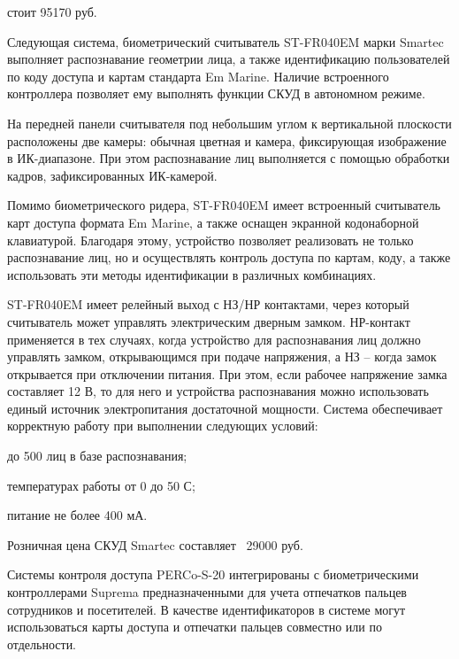 стоит 95170 руб.

Следующая система, биометрический считыватель ST-FR040EM марки Smartec выполняет распознавание геометрии лица, а также идентификацию пользователей по коду доступа и картам стандарта Em Marine. Наличие встроенного контроллера позволяет ему выполнять функции СКУД в автономном режиме. 


На передней панели считывателя под небольшим углом к вертикальной плоскости расположены две камеры: обычная цветная и камера, фиксирующая изображение в ИК-диапазоне. При этом распознавание лиц выполняется с помощью обработки кадров, зафиксированных ИК-камерой.

Помимо биометрического ридера, ST-FR040EM имеет встроенный считыватель карт доступа формата Em Marine, а также оснащен экранной кодонаборной клавиатурой. Благодаря этому, устройство позволяет реализовать не только распознавание лиц, но и осуществлять контроль доступа по картам, коду, а также использовать эти методы идентификации в различных комбинациях.

ST-FR040EM имеет релейный выход с НЗ/НР контактами, через который считыватель может управлять электрическим дверным замком. НР-контакт применяется в тех случаях, когда устройство для распознавания лиц должно управлять замком, открывающимся при подаче напряжения, а НЗ – когда замок открывается при отключении питания. При этом, если рабочее напряжение замка составляет 12 В, то для него и устройства распознавания можно использовать единый источник электропитания достаточной мощности. 
 Система обеспечивает корректную работу при выполнении следующих условий:

\begin{itemize*}
\item до 500 лиц в базе распознавания;
\item температурах работы от 0 до 50 С;
\item питание не более 400 мА.
\end{itemize*}


Розничная цена СКУД Smartec составляет ~29000 руб.

Системы контроля доступа PERCo-S-20 интегрированы с биометрическими контроллерами Suprema предназначенными для учета отпечатков пальцев сотрудников и посетителей. В качестве идентификаторов в системе могут использоваться карты доступа и отпечатки пальцев совместно или по отдельности.


